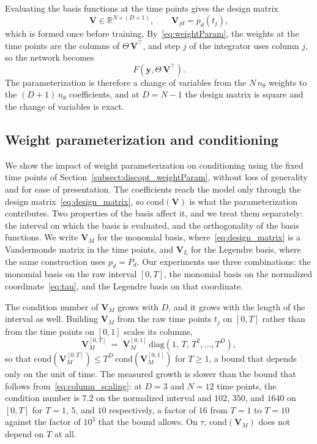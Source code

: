 \documentclass[pdflatex,sn-mathphys-num]{sn-jnl}%
\newcommand{\bfy}{\mathbf{y}}
\theoremstyle{thmstyleone}%
\theoremstyle{thmstyletwo}%
\theoremstyle{thmstylethree}%
\begin{document}
Evaluating the basis functions at the time points gives the design matrix
\begin{equation}\label{eq:design_matrix}
    \mathbf{V} \in \mathbb{R}^{N \times (D+1)},
    \qquad
    \mathbf{V}_{jd} = p_d(t_j),
\end{equation}
which is formed once before training. By~\eqref{eq:weightParam}, the weights at the time points are the columns of $\Theta\,\mathbf{V}^\top$, and step $j$ of the integrator uses column $j$, so the network becomes
\begin{equation*}F(\bfy, \Theta\,\mathbf{V}^{\!\top}).
\end{equation*}
The parameterization is therefore a change of variables from the $N\,n_\theta$ weights to the $(D+1)\,n_\theta$ coefficients, and at $D = N-1$ the design matrix is square and the change of variables is exact.

\subsection{Weight parameterization and conditioning}\label{subsect:weight_param_stability}
We show the impact of weight parameterization on conditioning using the fixed time points of Section~\ref{subsect:discopt_weightParam}, without loss of generality and for ease of presentation.
%
The coefficients reach the model only through the design matrix~\eqref{eq:design_matrix}, so $\mathrm{cond}(\mathbf{V})$ is what the parameterization contributes.
%
Two properties of the basis affect it, and we treat them separately: the interval on which the basis is evaluated, and the orthogonality of the basis functions.
%
We write $\mathbf{V}_M$ for the monomial basis, where~\eqref{eq:design_matrix} is a Vandermonde matrix in the time points, and $\mathbf{V}_L$ for the Legendre basis, where the same construction uses $p_d = P_d$.
%
Our experiments use three combinations: the monomial basis on the raw interval $[0,T]$, the monomial basis on the normalized coordinate~\eqref{eq:tau}, and the Legendre basis on that coordinate.

The condition number of $\mathbf{V}_M$ grows with $D$, and it grows with the length of the interval as well.
%
Building $\mathbf{V}_M$ from the raw time points $t_j$ on $[0,T]$ rather than from the time points on $[0,1]$ scales its columns,
\begin{equation}\label{eq:column_scaling}
    \mathbf{V}_M^{[0,T]} \;=\; \mathbf{V}_M^{[0,1]}\,\mathrm{diag}\!\left(1,\,T,\,T^2,\ldots,T^{D}\right),
\end{equation}
so that $\mathrm{cond}(\mathbf{V}_M^{[0,T]}) \le T^{D}\,\mathrm{cond}(\mathbf{V}_M^{[0,1]})$ for $T\ge1$, a bound that depends only on the unit of time.
%
The measured growth is slower than the bound that follows from~\eqref{eq:column_scaling}: at $D=3$ and $N=12$ time points, the condition number is $7.2$ on the normalized interval and $102$, $350$, and $1640$ on $[0,T]$ for $T=1$, $5$, and $10$ respectively, a factor of $16$ from $T=1$ to $T=10$ against the factor of $10^3$ that the bound allows.
%
On $\tau$, $\mathrm{cond}(\mathbf{V}_M)$ does not depend on $T$ at all.
\end{document}
